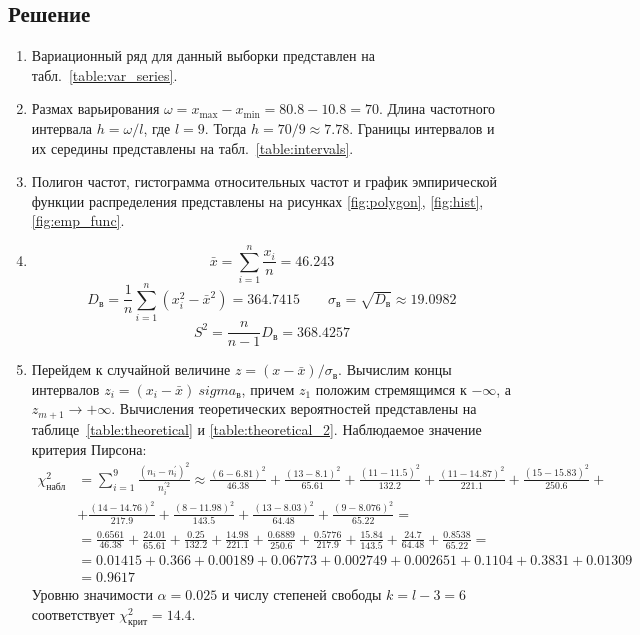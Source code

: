 \documentclass{article}
\theoremstyle{problemstyle}
\begin{document}
\subsection{Решение}
\begin{enumerate}
	\item Вариационный ряд для данный выборки представлен на табл.~\ref{table:var_series}.
	\item Размах варьирования \(\omega = x_{\max} - x_{\min} = 80.8 - 10.8 = 70\).
	      Длина частотного интервала \(h = \omega / l\), где \(l = 9\).
	      Тогда \(h = 70/9 \approx 7.78\).
	      Границы интервалов и их середины представлены на табл.~\ref{table:intervals}.
	\item Полигон частот, гистограмма относительных частот и
	      график эмпирической функции распределения представлены на рисунках
	      \ref{fig:polygon}, \ref{fig:hist}, \ref{fig:emp_func}.
	\item
	      \[ \bar x = \sum_{i = 1}^n \frac{x_i}{n} = 46.243 \]
	      \[
		      D_\text{в} =
		      \frac{1}{n} \sum_{i=1}^n \left( x_i^2 - \bar x^2 \right) =
		      364.7415
		      \qquad
		      \sigma_\text{в} =
		      \sqrt{D_\text{в}} \approx
		      19.0982
	      \]
	      \[ S^2 = \frac{n}{n-1} D_\text{в} = 368.4257 \]
	\item Перейдем к случайной величине \(z = (x - \bar x) / \sigma_\text{в} \).
	      Вычислим концы интервалов \(z_i = (x_i - \bar x) \ sigma_\text{в} \),
	      причем $z_1$ положим стремящимся к $-\infty$, а $z_{m+1} \to +\infty$.
	      Вычисления теоретических вероятностей представлены на таблице~\ref{table:theoretical} и \ref{table:theoretical_2}.
	      Наблюдаемое значение критерия Пирсона:
	      \begin{align*}
		      \chi_\text{набл}^2 & =
		      \sum_{i=1}^9 \frac{(n_i - n^\prime_i)^2}{ n_i^{\prime2}} \approx
		      \frac{(6 - 6.81)^2}{46.38} + \frac{(13 - 8.1)^2}{65.61} + \frac{(11 - 11.5)^2}{132.2} + \frac{(11 - 14.87)^2}{221.1} + \frac{(15 - 15.83)^2}{250.6} +                                                                          \\ &+ \frac{(14 - 14.76)^2}{217.9} + \frac{(8 - 11.98)^2}{143.5} + \frac{(13 - 8.03)^2}{64.48} + \frac{(9 - 8.076)^2}{65.22} = \\
		                         & = \frac{0.6561}{46.38} + \frac{24.01}{65.61} + \frac{0.25}{132.2} + \frac{14.98}{221.1} + \frac{0.6889}{250.6} + \frac{0.5776}{217.9} + \frac{15.84}{143.5} + \frac{24.7}{64.48} + \frac{0.8538}{65.22} = \\
		                         & = 0.01415 + 0.366 + 0.00189 + 0.06773 + 0.002749 + 0.002651 + 0.1104 + 0.3831 + 0.01309                                                                                                                   \\
		                         & = 0.9617
	      \end{align*}
	      Уровню значимости \(\alpha = 0.025\) и числу степеней свободы \(k = l - 3 = 6\)
	      соответствует $\chi^2_\text{крит} = 14.4 $.


\end{enumerate}
\end{document}
